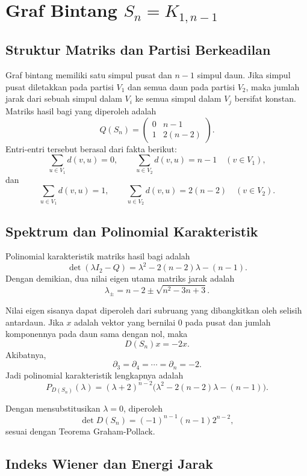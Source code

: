 \documentclass[12pt,a4paper]{article}
\begin{document}
\section{Graf Bintang $S_n=K_{1,n-1}$}

\subsection{Struktur Matriks dan Partisi Berkeadilan}

Graf bintang memiliki satu simpul pusat dan $n-1$ simpul daun. Jika simpul pusat diletakkan pada partisi $V_1$ dan semua daun pada partisi $V_2$, maka jumlah jarak dari sebuah simpul dalam $V_i$ ke semua simpul dalam $V_j$ bersifat konstan. Matriks hasil bagi yang diperoleh adalah
\[
  Q(S_n)=
  \begin{pmatrix}
    0 & n-1    \\
    1 & 2(n-2)
  \end{pmatrix}.
\]
Entri-entri tersebut berasal dari fakta berikut:
\[
  \sum_{u\in V_1} d(v,u)=0,
  \qquad
  \sum_{u\in V_2} d(v,u)=n-1
  \quad (v\in V_1),
\]
dan
\[
  \sum_{u\in V_1} d(v,u)=1,
  \qquad
  \sum_{u\in V_2} d(v,u)=2(n-2)
  \quad (v\in V_2).
\]

\subsection{Spektrum dan Polinomial Karakteristik}

Polinomial karakteristik matriks hasil bagi adalah
\[
  \det(\lambda I_2-Q)
  =
  \lambda^2-2(n-2)\lambda-(n-1).
\]
Dengan demikian, dua nilai eigen utama matriks jarak adalah
\[
  \lambda_{\pm}=n-2\pm \sqrt{n^2-3n+3}.
\]

Nilai eigen sisanya dapat diperoleh dari subruang yang dibangkitkan oleh selisih antardaun. Jika $x$ adalah vektor yang bernilai $0$ pada pusat dan jumlah komponennya pada daun sama dengan nol, maka
\[
  D(S_n)x=-2x.
\]
Akibatnya,
\[
  \partial_3=\partial_4=\cdots=\partial_n=-2.
\]
Jadi polinomial karakteristik lengkapnya adalah
\[
  P_{D(S_n)}(\lambda)
  =
  (\lambda+2)^{n-2}
  \bigl(\lambda^2-2(n-2)\lambda-(n-1)\bigr).
\]

Dengan mensubstitusikan $\lambda=0$, diperoleh
\[
  \det D(S_n)=(-1)^{n-1}(n-1)2^{n-2},
\]
sesuai dengan Teorema Graham-Pollack.

\subsection{Indeks Wiener dan Energi Jarak}
\end{document}
